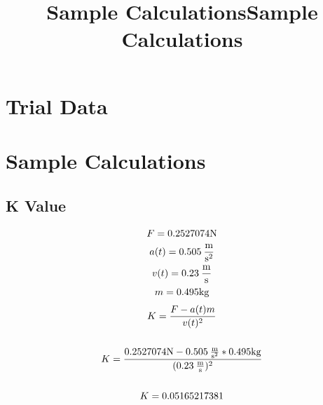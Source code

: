 \newpage
\appendix
\title{Sample Calculations}
\section{Trial Data}









\title{Sample Calculations}
\section{Sample Calculations}
\subsection{K Value}
\label{sampleCalc}
\begin{gather*}
    F = 0.2527074\textup{N} \\
    a(t) = 0.505 \: \frac{\textup{m}}{\textup{s}^2} \\
    v(t) = 0.23 \: \frac{\textup{m}}{\textup{s}} \\
    m = 0.495 \textup{kg}
\end{gather*}
\begin{gather*}
    K = \frac{F - a(t)m}{v(t)^2} \\\\
    K = \frac{0.2527074\textup{N} - 0.505 \: \frac{\textup{m}}{\textup{s}^2} *  0.495 \textup{kg}}{(0.23 \: \frac{\textup{m}}{\textup{s}})^2} \\\\
    K = 0.05165217381
\end{gather*}
